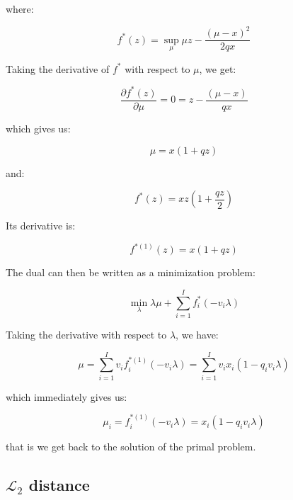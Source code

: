 \documentclass{tex/note}
\begin{document}
where:

\begin{equation*}
f^* \left( z \right) = \sup_{\mu} \mu z - \frac{\left( \mu - x \right)^2}{2 q x}
\end{equation*}

Taking the derivative of $f^*$ with respect to $\mu$, we get:

\begin{equation*}
\frac{\partial f^* \left( z \right)}{\partial \mu} = 0 = z - \frac{ \left( \mu - x \right)}{q x}
\end{equation*}

which gives us:

\begin{equation*}
\mu = x \left( 1 + q z \right)
\end{equation*}

and:

\begin{equation*}
f^* \left( z \right) = x z \left( 1 + \frac{q z}{2} \right)
\end{equation*}

Its derivative is:

\begin{equation*}
f^{* \left( 1 \right)} \left( z \right) = x \left( 1 + q z \right)
\end{equation*}

The dual can then be written as a minimization problem:

\begin{equation*}
\min_\lambda \lambda \mu + \sum_{i = 1}^I f_i^* \left( - v_i \lambda \right)
\end{equation*}

Taking the derivative with respect to $\lambda$, we have:

\begin{equation*}
\mu = \sum_{i = 1}^I v_i f_i^{* \left( 1 \right)} \left( - v_i \lambda \right) = \sum_{i = 1}^I v_i x_i \left( 1 - q_i v_i \lambda \right)
\end{equation*}

which immediately gives us:

\begin{equation*}
\mu_i = f_i^{* \left( 1 \right)} \left( - v_i \lambda \right) = x_i \left( 1 - q_i v_i \lambda \right)
\end{equation*}

that is we get back to the solution of the primal problem.

\subsection{$\mathcal{L}_2$ distance}
\end{document}

